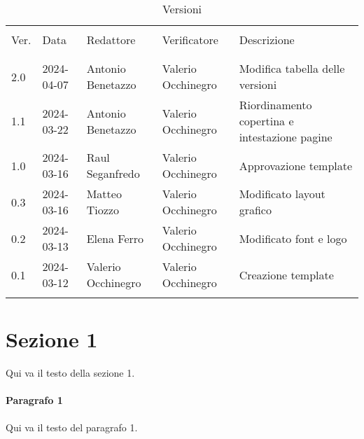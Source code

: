 \documentclass[italian,12pt]{article}
\begin{document}


\newpage



\begin{table}[!h]
	\caption{Versioni}
	\footnotesize
	\begin{center}
		\begin{tabular}{ l l l l l }
			\hline                                                                                                      \\[-2ex]
			Ver. & Data       & Redattore          & Verificatore       & Descrizione                                   \\
			\\[-2ex] \hline \\[-1.5ex]
			2.0  & 2024-04-07 & Antonio Benetazzo  & Valerio Occhinegro & Modifica tabella delle versioni               \\
			1.1  & 2024-03-22 & Antonio Benetazzo  & Valerio Occhinegro & Riordinamento copertina e intestazione pagine \\
			1.0  & 2024-03-16 & Raul Seganfredo    & Valerio Occhinegro & Approvazione template                         \\
			0.3  & 2024-03-16 & Matteo Tiozzo      & Valerio Occhinegro & Modificato layout grafico                     \\
			0.2  & 2024-03-13 & Elena Ferro        & Valerio Occhinegro & Modificato font e logo                        \\
			0.1  & 2024-03-12 & Valerio Occhinegro & Valerio Occhinegro & Creazione template                            \\
			\\[-1.5ex] \hline
		\end{tabular}
	\end{center}
\end{table}

\newpage

\tableofcontents

\newpage

\section{Sezione 1}
Qui va il testo della sezione 1.

\paragraph{Paragrafo 1}
Qui va il testo del paragrafo 1.
\end{document}
